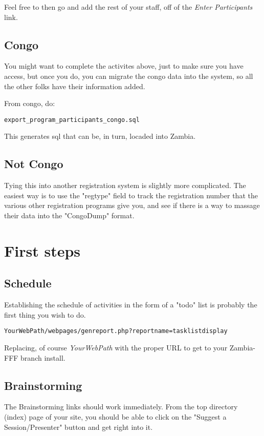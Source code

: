 \documentclass[captions=tablesignature]{scrartcl}
\begin{document}
Feel free to then go and add the rest of your staff, off of the
\emph{Enter Participants} link.

\subsection{Congo}
\label{sec-7-2}
You might want to complete the activites above, just to make sure
you have access, but once you do, you can migrate the congo data
into the system, so all the other folks have their information
added.

From congo, do:
\begin{verbatim}
export_program_participants_congo.sql
\end{verbatim}

This generates sql that can be, in turn, locaded into Zambia.
\subsection{Not Congo}
\label{sec-7-3}
Tying this into another registration system is slightly more
complicated.  The easiest way is to use the "regtype" field to
track the registration number that the various other registration
programs give you, and see if there is a way to massage their data
into the "CongoDump" format.

\section{First steps}
\label{sec-8}
\subsection{Schedule}
\label{sec-8-1}
Establishing the schedule of activities in the form of a "todo"
list is probably the first thing you wish to do.

\begin{verbatim}
YourWebPath/webpages/genreport.php?reportname=tasklistdisplay
\end{verbatim}

Replacing, of course \emph{YourWebPath} with the proper URL to get to
your Zambia-FFF branch install.

\subsection{Brainstorming}
\label{sec-8-2}
The Brainstorming links should work immediately.  From the top
directory (index) page of your site, you should be able to click on
the "Suggest a Session/Presenter" button and get right into it.
\end{document}
